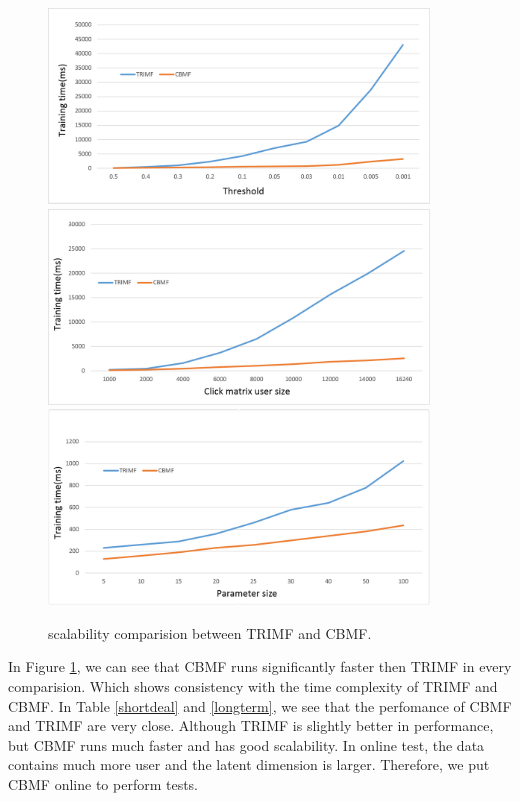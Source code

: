 \begin{figure}
\begin{center}
\includegraphics[width=0.9\textwidth]{fig/cbmf1.png} 
\includegraphics[width=0.9\textwidth]{fig/cbmf2.png} 
\includegraphics[width=0.9\textwidth]{fig/cbmfsize.png} 

\caption{scalability comparision between TRIMF and CBMF.}
\label{fig:cbmfall}
\end{center}
\end{figure}



In Figure \ref{fig:cbmfall}, we can see that CBMF runs significantly faster then TRIMF in every comparision. Which shows consistency with the time complexity of TRIMF and CBMF. In Table \ref{shortdeal} and \ref{longterm}, we see that the perfomance of CBMF and TRIMF are very close. Although TRIMF is slightly better in performance, but CBMF runs much faster and has good scalability. In online test, the data contains much more user and the latent dimension is larger. Therefore, we put CBMF online to perform tests.




